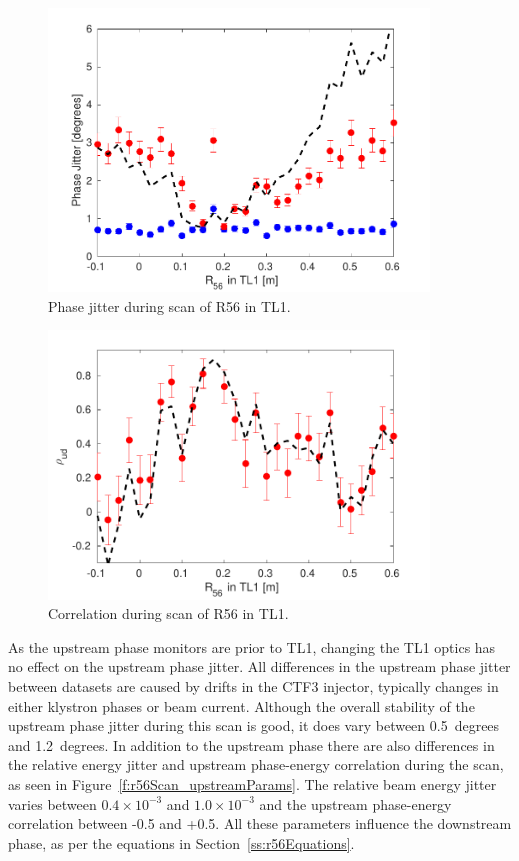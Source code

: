 \begin{figure}
  \centering
  \includegraphics[width=0.9\textwidth]{Figures/propagation/r56Scan_meanPhaseJit}
  \caption{Phase jitter during scan of R56 in TL1.}
  \label{f:r56Scan_meanPhaseJit}
\end{figure}

\begin{figure}
  \centering
  \includegraphics[width=0.9\textwidth]{Figures/propagation/r56Scan_correlation}
  \caption{Correlation during scan of R56 in TL1.}
  \label{f:r56Scan_correlation}
\end{figure}

As the upstream phase monitors are prior to TL1, changing the TL1 optics has no effect on the upstream phase jitter. All differences in the upstream phase jitter between datasets are caused by drifts in the CTF3 injector, typically changes in either klystron phases or beam current. Although the overall stability of the upstream phase jitter during this scan is good, it does vary between 0.5~degrees and 1.2~degrees. In addition to the upstream phase there are also differences in the relative energy jitter and upstream phase-energy correlation during the scan, as seen in Figure~\ref{f:r56Scan_upstreamParams}. The relative beam energy jitter varies between \(0.4\times10^{-3}\) and \(1.0\times10^{-3}\) and the upstream phase-energy correlation between -0.5 and +0.5. All these parameters influence the downstream phase, as per the equations in Section~\ref{ss:r56Equations}.

